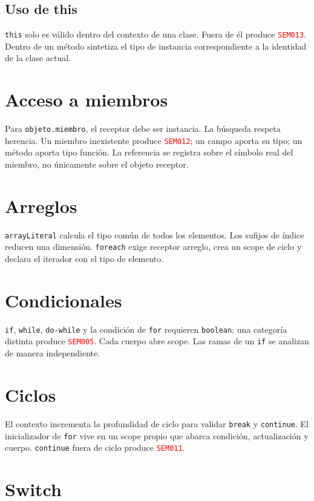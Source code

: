 \documentclass[11pt,letterpaper,oneside]{report}
\newcommand{\codigo}[1]{\texttt{#1}}
\newcommand{\diag}[1]{\textcolor{red}{\texttt{#1}}}
\begin{document}
\subsection{Uso de this}

\codigo{this} solo es válido dentro del contexto de una clase. Fuera de él produce
\diag{SEM013}. Dentro de un método sintetiza el tipo de instancia correspondiente a
la identidad de la clase actual.

\section{Acceso a miembros}

Para \codigo{objeto.miembro}, el receptor debe ser instancia. La búsqueda respeta
herencia. Un miembro inexistente produce \diag{SEM012}; un campo aporta su tipo; un
método aporta tipo función. La referencia se registra sobre el símbolo real del
miembro, no únicamente sobre el objeto receptor.

\section{Arreglos}

\codigo{arrayLiteral} calcula el tipo común de todos los elementos. Los sufijos de
índice reducen una dimensión. \codigo{foreach} exige receptor arreglo, crea un scope
de ciclo y declara el iterador con el tipo de elemento.

\section{Condicionales}

\codigo{if}, \codigo{while}, \codigo{do-while} y la condición de
\codigo{for} requieren \codigo{boolean}; una categoría distinta produce
\diag{SEM005}. Cada cuerpo abre scope. Las ramas de un \codigo{if} se analizan de
manera independiente.

\section{Ciclos}

El contexto incrementa la profundidad de ciclo para validar \codigo{break} y
\codigo{continue}. El inicializador de \codigo{for} vive en un scope propio que
abarca condición, actualización y cuerpo. \codigo{continue} fuera de ciclo produce
\diag{SEM011}.

\section{Switch}
\end{document}
